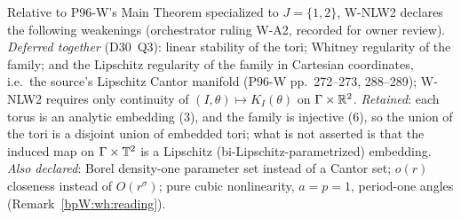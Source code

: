 \begin{remark}\label{bpW:wh:weakenings}
Relative to P96-W's Main Theorem specialized to $J=\{1,2\}$, W-NLW2 declares the following weakenings (orchestrator
ruling W-A2, recorded for owner review). \emph{Deferred together} (D30~Q3): linear stability of the tori; Whitney
regularity of the family; and the Lipschitz regularity of the family in Cartesian coordinates, i.e.\ the source's
Lipschitz Cantor manifold (P96-W pp.~272--273, 288--289); W-NLW2 requires only continuity of
$(I,\theta)\mapsto K_I(\theta)$ on $\Gamma\times\mathbb{R}^2$. \emph{Retained}: each torus is an analytic embedding (3), and
the family is injective (6), so the union of the tori is a disjoint union of embedded tori; what is not asserted is
that the induced map on $\Gamma\times\mathbb{T}^2$ is a Lipschitz (bi-Lipschitz-parametrized) embedding. \emph{Also
declared}: Borel density-one parameter set instead of a Cantor set; $o(r)$ closeness instead of $O(r^\sigma)$;
pure cubic nonlinearity, $a=p=1$, period-one angles (Remark~\ref{bpW:wh:reading}).
\end{remark}
